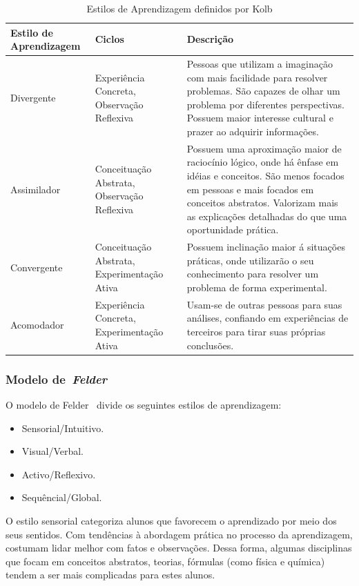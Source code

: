 \begin{table}
	\caption{Estilos de Aprendizagem definidos por Kolb}
	\begin{tabular}{|p{4cm} | p{3cm} | p{7cm} |}
		\hline
		\textbf{Estilo de Aprendizagem}	& \textbf{Ciclos} & \textbf{Descrição}	\\
		\hline
		Divergente	& Experiência Concreta, Observação Reflexiva & Pessoas que utilizam a imaginação com mais facilidade para resolver problemas. São capazes de olhar um problema por diferentes perspectivas. Possuem maior interesse cultural e prazer ao adquirir informações. 	\\
		\hline
		Assimilador	& Conceituação Abstrata, Observação Reflexiva & Possuem uma aproximação maior de raciocínio lógico, onde há ênfase em idéias e conceitos. São menos focados em pessoas e mais focados em conceitos abstratos. Valorizam mais as explicações detalhadas do que uma oportunidade prática. 	\\
		\hline
		Convergente	& Conceituação Abstrata, Experimentação Ativa & Possuem inclinação maior á situações práticas, onde utilizarão o seu conhecimento para resolver um problema de forma experimental.	\\
		\hline
		Acomodador	& Experiência Concreta, Experimentação Ativa & Usam-se de outras pessoas para suas análises, confiando em experiências de terceiros para tirar suas próprias conclusões.	\\
		\hline
	\end{tabular}
	\label{lista_estilos_aprendizagem}
\end{table}

\subsubsection{Modelo de~\emph{Felder}}
O modelo de Felder~\cite{felder1988learning} divide os seguintes estilos de aprendizagem:
\begin{itemize}
	\item Sensorial/Intuitivo.
	\item Visual/Verbal.
	\item Activo/Reflexivo.
	\item Sequêncial/Global.
\end{itemize}

O estilo sensorial categoriza alunos que favorecem o aprendizado por meio dos seus sentidos. Com tendências à abordagem prática no processo da aprendizagem, costumam lidar melhor com fatos e observações. Dessa forma, algumas disciplinas que focam em conceitos abstratos, teorias, fórmulas (como física e química) tendem a ser mais complicadas para estes alunos.


